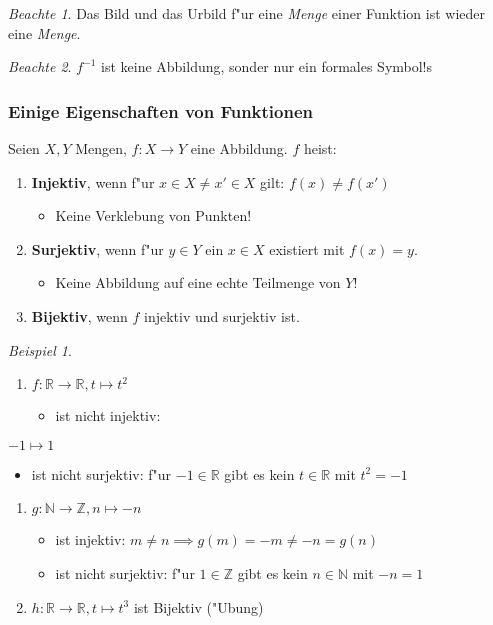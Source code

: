 \documentclass[11pt]{article}
\theoremstyle{remark}
\newtheorem{exa}{Beispiel}[section]
\newtheorem*{notte}{Beachte}
\theoremstyle{definition}
\theoremstyle{remark}
\begin{document}
\begin{notte}
Das Bild und das Urbild f"ur eine \emph{Menge} einer Funktion ist wieder eine \emph{Menge}.
\end{notte}


\begin{notte}
\(f^{-1}\) ist keine Abbildung, sonder nur ein formales Symbol!s
\end{notte}

\subsubsection{Einige Eigenschaften von Funktionen}
\label{sec:org1909a84}
Seien \(X,Y\) Mengen, \(f: X\to Y\) eine Abbildung. \(f\) heist:
\begin{relation}
\begin{enumerate}
\item \textbf{Injektiv}, wenn f"ur \(x\in X\not = x' \in X\) gilt: \(f(x) \not = f(x')\)
\begin{itemize}
\item Keine Verklebung von Punkten!
\end{itemize}
\item \textbf{Surjektiv}, wenn f"ur \(y\in Y\) ein \(x\in X\) existiert mit \(f(x)=y\).
\begin{itemize}
\item Keine Abbildung auf eine echte Teilmenge von \(Y\)!
\end{itemize}
\item \textbf{Bijektiv}, wenn \(f\) injektiv und surjektiv ist.
\end{enumerate}
\end{relation}

\begin{exa}\
\begin{enumerate}
\item \(f: \mathbb{R} \to \mathbb{R}, t\mapsto t^2\) 
\begin{itemize}
\item ist nicht injektiv:
\end{itemize}
\end{enumerate}
\(-1\mapsto 1\)
\begin{itemize}
\item ist nicht surjektiv: f"ur \(-1\in \mathbb{R}\) gibt es kein \(t\in\mathbb{R}\)
mit \(t^2=-1\)
\end{itemize}
\begin{enumerate}
\item \(g: \mathbb{N}\to\mathbb{Z}, n\mapsto-n\)
\begin{itemize}
\item ist injektiv: \(m\ne n\implies g(m)=-m \ne -n = g(n)\)
\item ist nicht surjektiv: f"ur \(1\in \mathbb{Z}\) gibt es kein \(n\in \mathbb{N}\)
mit \(-n=1\)
\end{itemize}
\item \(h: \mathbb{R}\to\mathbb{R},t\mapsto t^3\) ist Bijektiv ("Ubung)
\end{enumerate}
\end{exa}
\end{document}
